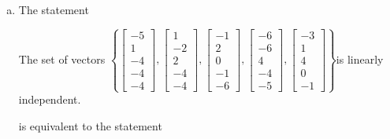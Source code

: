 \begin{exerciseAnswer}
\begin{enumerate}[(a)]
\item The statement 
\begin{center}\begin{minipage}{0.8\textwidth}
 The set of vectors \( \left\{ \left[\begin{array}{c}
-5 \\
1 \\
-4 \\
-4 \\
-4
\end{array}\right] , \left[\begin{array}{c}
1 \\
-2 \\
2 \\
-4 \\
-4
\end{array}\right] , \left[\begin{array}{c}
-1 \\
2 \\
0 \\
-1 \\
-6
\end{array}\right] , \left[\begin{array}{c}
-6 \\
-6 \\
4 \\
-4 \\
-5
\end{array}\right] , \left[\begin{array}{c}
-3 \\
1 \\
4 \\
0 \\
-1
\end{array}\right] \right\} \)is linearly independent.
\end{minipage}\end{center}
     is equivalent to the statement 
\begin{center}\begin{minipage}{0.8\textwidth}
 The vector equation \( x_{1} \left[\begin{array}{c}
-5 \\
1 \\
-4 \\
-4 \\
-4
\end{array}\right] + x_{2} \left[\begin{array}{c}
1 \\
-2 \\

\end{array}
\end{minipage}
\end{center}
\end{enumerate}
\end{exerciseAnswer}
